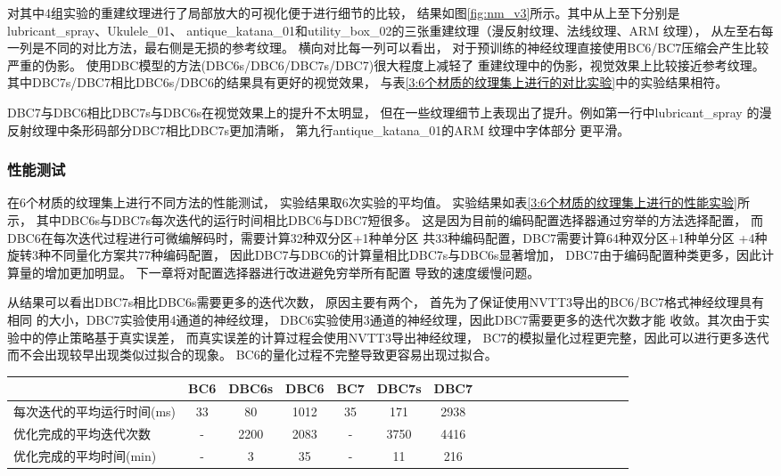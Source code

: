 对其中4组实验的重建纹理进行了局部放大的可视化便于进行细节的比较，
结果如图\ref{fig:nm_v3}所示。其中从上至下分别是
lubricant\_spray、Ukulele\_01、
antique\_katana\_01和utility\_box\_02的三张重建纹理（漫反射纹理、法线纹理、ARM 纹理），
从左至右每一列是不同的对比方法，最右侧是无损的参考纹理。
横向对比每一列可以看出，
对于预训练的神经纹理直接使用BC6/BC7压缩会产生比较严重的伪影。
使用DBC模型的方法(DBC6s/DBC6/DBC7s/DBC7)很大程度上减轻了
重建纹理中的伪影，视觉效果上比较接近参考纹理。
其中DBC7s/DBC7相比DBC6s/DBC6的结果具有更好的视觉效果，
与表\ref{3:6个材质的纹理集上进行的对比实验}中的实验结果相符。

DBC7与DBC6相比DBC7s与DBC6s在视觉效果上的提升不太明显，
但在一些纹理细节上表现出了提升。例如第一行中lubricant\_spray
的漫反射纹理中条形码部分DBC7相比DBC7s更加清晰，
第九行antique\_katana\_01的ARM 纹理中字体部分
更平滑。


\subsubsection{性能测试}
\label{3:性能测试}
在6个材质的纹理集上进行不同方法的性能测试，
实验结果取6次实验的平均值。
实验结果如表\ref{3:6个材质的纹理集上进行的性能实验}所示，
其中DBC6s与DBC7s每次迭代的运行时间相比DBC6与DBC7短很多。
这是因为目前的编码配置选择器通过穷举的方法选择配置，
而DBC6在每次迭代过程进行可微编解码时，需要计算32种双分区+1种单分区
共33种编码配置，DBC7需要计算64种双分区+1种单分区
+4种旋转\times3种不同量化方案共77种编码配置，
因此DBC7与DBC6的计算量相比DBC7s与DBC6s显著增加，
DBC7由于编码配置种类更多，因此计算量的增加更加明显。
下一章将对配置选择器进行改进避免穷举所有配置
导致的速度缓慢问题。

从结果可以看出DBC7s相比DBC6s需要更多的迭代次数，
原因主要有两个，
首先为了保证使用NVTT3导出的BC6/BC7格式神经纹理具有相同
的大小，DBC7实验使用4通道的神经纹理，
DBC6实验使用3通道的神经纹理，因此DBC7需要更多的迭代次数才能
收敛。其次由于实验中的停止策略基于真实误差，
而真实误差的计算过程会使用NVTT3导出神经纹理，
BC7的模拟量化过程更完整，因此可以进行更多迭代
而不会出现较早出现类似过拟合的现象。
BC6的量化过程不完整导致更容易出现过拟合。

\begin{table*}[htbp]
    \centering
    \caption{6个材质的纹理集上进行的性能测试结果}
    \label{3:6个材质的纹理集上进行的性能实验}        
    \begin{tabular}{lcccccccccccccccccc}
        \toprule
                                    & BC6 & DBC6s & DBC6 & BC7  & DBC7s & DBC7 \\
        \midrule
        每次迭代的平均运行时间(ms)  & 33  &  80    & 1012 & 35   & 171   &  2938 \\
        优化完成的平均迭代次数      & -   &  2200  & 2083 & -   & 3750   &  4416 \\
        优化完成的平均时间(min)     & -   &  3     & 35   & -   & 11      &  216\\
        \bottomrule
\end{tabular} %
\end{table*}

